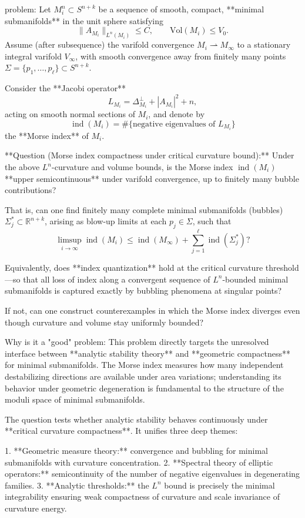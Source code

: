 problem:  
Let \( M_i^n \subset S^{n+k} \) be a sequence of smooth, compact, **minimal submanifolds** in the unit sphere satisfying  
\[
\|A_{M_i}\|_{L^n(M_i)} \le C, \qquad \mathrm{Vol}(M_i)\le V_0.
\]  
Assume (after subsequence) the varifold convergence \(M_i \rightharpoonup M_\infty\) to a stationary integral varifold \(V_\infty\), with smooth convergence away from finitely many points \( \Sigma = \{p_1, \dots, p_\ell\} \subset S^{n+k}\).

Consider the **Jacobi operator**
\[
L_{M_i} = \Delta_{M_i}^{\perp} + |A_{M_i}|^2 + n,
\]
acting on smooth normal sections of \(M_i\), and denote by  
\[
\operatorname{ind}(M_i) = \#\{\text{negative eigenvalues of }L_{M_i}\}
\]
the **Morse index** of \(M_i\).

**Question (Morse index compactness under critical curvature bound):**  
Under the above \(L^n\)-curvature and volume bounds, is the Morse index \(\operatorname{ind}(M_i)\) **upper semicontinuous** under varifold convergence, up to finitely many bubble contributions?  

That is, can one find finitely many complete minimal submanifolds (bubbles) \(\Sigma_j^\ast \subset \mathbb{R}^{n+k}\), arising as blow-up limits at each \(p_j \in \Sigma\), such that
\[
\limsup_{i\to\infty}\operatorname{ind}(M_i) \le \operatorname{ind}(M_\infty) + \sum_{j=1}^\ell \operatorname{ind}(\Sigma_j^\ast)?
\]

Equivalently, does **index quantization** hold at the critical curvature threshold—so that all loss of index along a convergent sequence of \(L^n\)-bounded minimal submanifolds is captured exactly by bubbling phenomena at singular points?

If not, can one construct counterexamples in which the Morse index diverges even though curvature and volume stay uniformly bounded?

Why is it a "good" problem:  
This problem directly targets the unresolved interface between **analytic stability theory** and **geometric compactness** for minimal submanifolds. The Morse index measures how many independent destabilizing directions are available under area variations; understanding its behavior under geometric degeneration is fundamental to the structure of the moduli space of minimal submanifolds.

The question tests whether analytic stability behaves continuously under **critical curvature compactness**. It unifies three deep themes:

1. **Geometric measure theory:** convergence and bubbling for minimal submanifolds with curvature concentration.
2. **Spectral theory of elliptic operators:** semicontinuity of the number of negative eigenvalues in degenerating families.
3. **Analytic thresholds:** the \(L^n\) bound is precisely the minimal integrability ensuring weak compactness of curvature and scale invariance of curvature energy.

